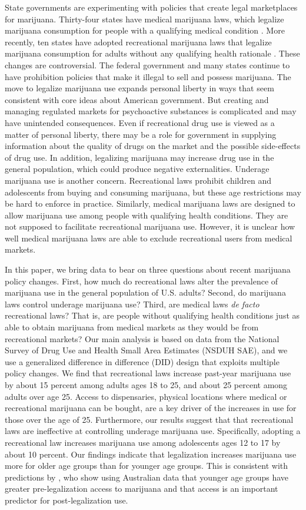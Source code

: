 \documentclass[12pt]{article}%
\begin{document}
State governments are experimenting with policies that create legal marketplaces for marijuana. Thirty-four states have medical marijuana laws, which legalize marijuana consumption for people with a qualifying medical condition \citep{ProCon2018b}. More recently, ten states have adopted recreational marijuana laws that legalize marijuana consumption for adults without any qualifying health rationale \citep{ProCon2018}. These changes are controversial. The federal government and many states continue to have prohibition policies that make it illegal to sell and possess marijuana. 
The move to legalize marijuana use expands personal liberty in ways that seem consistent with core ideas about American government. But creating and managing regulated markets for psychoactive substances is complicated and may have unintended consequences. Even if recreational drug use is viewed as a matter of personal liberty, there may be a role for government in supplying information about the quality of drugs on the market and the possible side-effects of drug use. In addition, legalizing marijuana may increase drug use in the general population, which could produce negative externalities. Underage marijuana use is another concern. Recreational laws prohibit children and adolescents from buying and consuming marijuana, but these age restrictions may be hard to enforce in practice. Similarly, medical marijuana laws are designed to allow marijuana use among people with qualifying health conditions. They are not supposed to facilitate recreational marijuana use. However, it is unclear how well medical marijuana laws are able to exclude recreational users from medical markets.

In this paper, we bring data to bear on three questions about recent marijuana policy changes. First, how much do recreational laws alter the prevalence of marijuana use in the general population of U.S. adults? Second, do marijuana laws control underage marijuana use? Third, are medical laws \emph{de facto} recreational laws? That is, are people without qualifying health conditions just as able to obtain marijuana from medical markets as they would be from recreational markets? Our main analysis is based on data from the National Survey of Drug Use and Health Small Area Estimates (NSDUH SAE), and we use a generalized difference in difference (DID) design that exploits multiple policy changes. We find that recreational laws increase past-year marijuana use by about 15 percent among adults ages 18 to 25, and about 25 percent among adults over age 25. Access to dispensaries, physical locations where medical or recreational marijuana can be bought, are a key driver of the increases in use for those over the age of 25. Furthermore, our results suggest that that recreational laws are ineffective at controlling underage marijuana use. Specifically, adopting a recreational law increases marijuana use among adolescents ages 12 to 17 by about 10 percent. Our findings indicate that legalization increases marijuana use more for older age groups than for younger age groups. This is consistent with predictions by \citet{Jacobi2016}, who show using Australian data that younger age groups have greater pre-legalization access to marijuana and that access is an important predictor for post-legalization use. 
\end{document}
